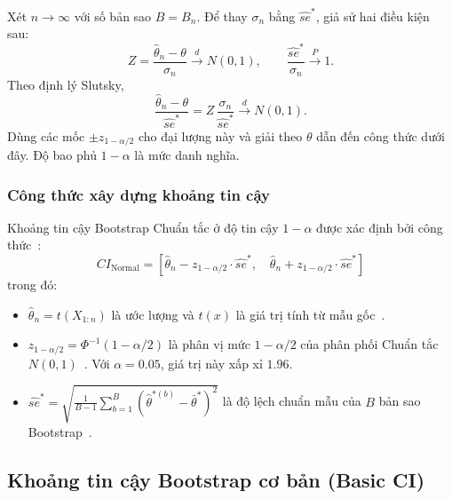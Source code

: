 \documentclass[12pt,a4paper]{article}
\theoremstyle{definition}
\numberwithin{equation}{section}
\begin{document}
    Xét $n\to\infty$ với số bản sao $B=B_n$. Để thay $\sigma_n$ bằng
    $\widehat{se}^*$, giả sử hai điều kiện sau:
    \[
        Z=\frac{\hat{\theta}_n-\theta}{\sigma_n}
        \xrightarrow{d}N(0,1),
        \qquad
        \frac{\widehat{se}^*}{\sigma_n}\xrightarrow{P}1.
    \]
    Theo định lý Slutsky,
    \[
        \frac{\hat{\theta}_n-\theta}{\widehat{se}^*}
        = Z\,\frac{\sigma_n}{\widehat{se}^*}\xrightarrow{d}N(0,1).
    \]
    Dùng các mốc $\pm z_{1-\alpha/2}$ cho đại lượng này và giải theo $\theta$
    dẫn đến công thức dưới đây. Độ bao phủ $1-\alpha$ là mức danh nghĩa.

    \subsubsection{Công thức xây dựng khoảng tin cậy}
	Khoảng tin cậy Bootstrap Chuẩn tắc ở độ tin cậy $1 - \alpha$ được xác định bởi công thức~\cite{buithuytrang2026,rizzo2019}:
	\begin{equation}
		CI_{\text{Normal}} = \left[ \hat{\theta}_n - z_{1-\alpha/2} \cdot \widehat{se}^*, \quad \hat{\theta}_n + z_{1-\alpha/2} \cdot \widehat{se}^* \right]
	\end{equation}
	trong đó:
	\begin{itemize}
		\item $\hat\theta_n=t(X_{1:n})$ là ước lượng và $t(x)$ là giá trị tính từ mẫu gốc~\cite[Chương 4]{buithuytrang2026}.
		\item $z_{1-\alpha/2} = \Phi^{-1}(1 - \alpha/2)$ là phân vị mức $1-\alpha/2$ của phân phối Chuẩn tắc $N(0,1)$~\cite[Chương 4]{buithuytrang2026}. Với $\alpha=0.05$, giá trị này xấp xỉ $1.96$.
		\item $\widehat{se}^* = \sqrt{\frac{1}{B-1}\sum_{b=1}^{B} \left(\hat{\theta}^{*(b)} - \bar{\theta}^*\right)^2}$ là độ lệch chuẩn mẫu của $B$ bản sao Bootstrap~\cite{buithuytrang2026,rizzo2019}.
	\end{itemize}

	\subsection{Khoảng tin cậy Bootstrap cơ bản (Basic CI)}
\end{document}
